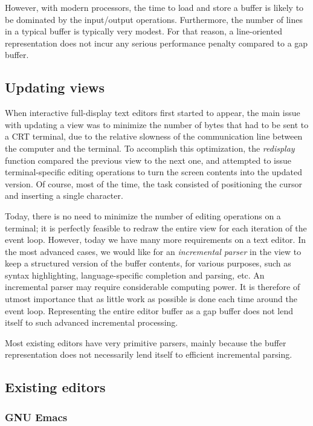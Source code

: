 However, with modern processors, the time to load and store a buffer
is likely to be dominated by the input/output operations.
Furthermore, the number of lines in a typical buffer is typically very
modest.  For that reason, a line-oriented representation does not
incur any serious performance penalty compared to a gap buffer.

\subsection{Updating views}

When interactive full-display text editors first started to appear,
the main issue with updating a view was to minimize the number of
bytes that had to be sent to a CRT terminal, due to the relative
slowness of the communication line between the computer and the
terminal.  To accomplish this optimization, the \emph{redisplay}
function compared the previous view to the next one, and attempted to
issue terminal-specific editing operations to turn the screen contents
into the updated version.  Of course, most of the time, the task
consisted of positioning the cursor and inserting a single character.

Today, there is no need to minimize the number of editing operations
on a terminal; it is perfectly feasible to redraw the entire view for
each iteration of the event loop.  However, today we have many more
requirements on a text editor.  In the most advanced cases, we would
like for an \emph{incremental parser} in the view to keep a structured
version of the buffer contents, for various purposes, such as syntax
highlighting, language-specific completion and parsing, etc.  An
incremental parser may require considerable computing power.  It is
therefore of utmost importance that as little work as possible is done
each time around the event loop.  Representing the entire editor
buffer as a gap buffer does not lend itself to such advanced
incremental processing.

Most existing editors have very primitive parsers, mainly because the
buffer representation does not necessarily lend itself to efficient
incremental parsing.

\subsection{Existing editors}

\subsubsection{GNU Emacs}

